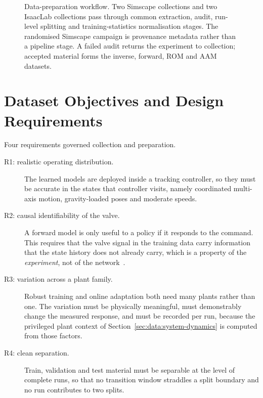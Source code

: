 \begin{figure}[p]
  \caption{Data-preparation workflow. Two Simscape collections and two
  IsaacLab collections pass through common extraction, audit, run-level
  splitting and training-statistics normalisation stages. The randomised
  Simscape campaign is provenance metadata rather than a pipeline stage. A
  failed audit returns the experiment to collection; accepted material forms
  the inverse, forward, ROM and AAM datasets.}
  \label{fig:data:pipeline}
\end{figure}

\section{Dataset Objectives and Design Requirements}
\label{sec:data:objectives}



Four requirements governed collection and preparation.

\begin{description}
  \item[R1: realistic operating distribution.] The learned models are
    deployed inside a tracking controller, so they must be accurate in the
    states that controller visits, namely coordinated multi-axis motion,
    gravity-loaded poses and moderate speeds.
  \item[R2: causal identifiability of the valve.] A forward model is
    only useful to a policy if it responds to the command. This requires
    that the valve signal in the training data carry information that the
    state history does not already carry, which is a property of the
    \emph{experiment}, not of the network~\cite{ljung1999system,
    isermann2011identification}.
  \item[R3: variation across a plant family.] Robust training and online
    adaptation both need many plants rather than one. The variation must be
    physically meaningful, must demonstrably change the measured response, and
    must be recorded per run, because the privileged plant context of
    Section~\ref{sec:data:system-dynamics} is computed from those factors.
  \item[R4: clean separation.] Train, validation and test material must be
    separable at the level of complete runs, so that no transition window
    straddles a split boundary and no run contributes to two splits.
\end{description}

